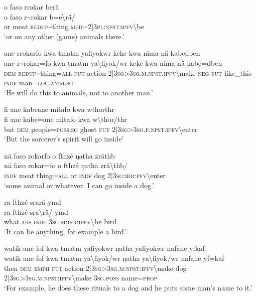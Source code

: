 \ea\label{ex:a4366}
o faso rrokar berä\\
\gll o	faso	r{\textasciitilde}rokar	b=e{\textbackslash}rä/\\
     or	meat	\textsc{redup}{\textasciitilde}thing	\textsc{med}=2|3\textsc{pl}:\textsc{npst}:\textsc{ipfv}{\textbackslash}be\\
\glt `or on any other (game) animals there.'
\z

\ea\label{ex:a4367}
ane rrokarfo kwa tmatm yafiyokwr keke kwa nima nä kabedben\\
\gll ane	r{\textasciitilde}rokar=fo	kwa	tmatm	ya{\textbackslash}fiyok/wr	keke	kwa	nima	nä	kabe=dben\\
     \textsc{dem}	\textsc{redup}{\textasciitilde}thing=\textsc{all}	\textsc{fut}	action	2|3\textsc{sg}>3\textsc{sg}.\textsc{m}:\textsc{npst}:\textsc{ipfv}{\textbackslash}make	\textsc{neg}	\textsc{fut}	like\_this	\textsc{indf}	man=\textsc{loc}.\textsc{anim}.\textsc{sg}\\
\glt `He will do this to animals, not to another man.'
\z

\ea\label{ex:a4368}
fi ane kabeane mitafo kwa wthorthr\\
\gll fi	ane	kabe=ane	mitafo	kwa	w{\textbackslash}thor/thr\\
     but	\textsc{dem}	people=\textsc{poss}.\textsc{sg}	ghost	\textsc{fut}	2|3\textsc{sg}>3\textsc{sg}.\textsc{f}:\textsc{npst}:\textsc{ipfv}{\textbackslash}enter\\
\glt `But the sorcerer's spirit will go inside'
\z

\ea\label{ex:a4369}
nä faso rokarfo o fthzé ŋatha zräthb\\
\gll nä	faso	rokar=fo	o	fthzé	ŋatha	zrä{\textbackslash}thb/\\
     \textsc{indf}	meat	thing=\textsc{all}	or	\textsc{indf}	dog	2|3\textsc{sg}:\textsc{irr}:\textsc{pfv}{\textbackslash}enter\\
\glt `some animal or whatever. I can go inside a dog.'
\z

\ea\label{ex:a4370}
ra fthzé srarä ymd\\
\gll ra	fthzé	sra{\textbackslash}rä/	ymd\\
     what.\textsc{abs}	\textsc{indf}	3\textsc{sg}.\textsc{m}:\textsc{irr}:\textsc{ipfv}{\textbackslash}be	bird\\
\glt `It can be anything, for example a bird.'
\z

\ea\label{ex:a4371}
watik ane fof kwa tmatm yafiyokwr ŋatha yafiyokwr nafane yfkaf\\
\gll watik	ane	fof	kwa	tmatm	ya{\textbackslash}fiyok/wr	ŋatha	ya{\textbackslash}fiyok/wr	nafane	yf=kaf\\
     then	\textsc{dem}	\textsc{emph}	\textsc{fut}	action	2|3\textsc{sg}>3\textsc{sg}.\textsc{m}:\textsc{npst}:\textsc{ipfv}{\textbackslash}make	dog	2|3\textsc{sg}>3\textsc{sg}.\textsc{m}:\textsc{npst}:\textsc{ipfv}{\textbackslash}make	3\textsc{sg}.\textsc{poss}	name=\textsc{prop}\\
\glt `For example, he does these rituals to a dog and he puts some man's name to it.'
\z

